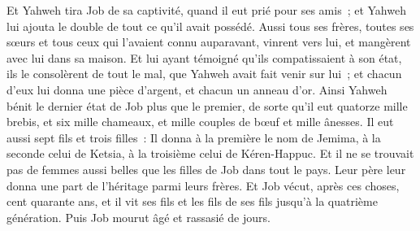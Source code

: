 \begin{multicols}{2}
Et Yahweh tira Job de sa captivité, quand il eut prié pour ses amis~; et Yahweh lui ajouta le double de tout ce qu'il avait possédé.
Aussi tous ses frères, toutes ses sœurs et tous ceux qui l'avaient connu auparavant, vinrent vers lui, et mangèrent avec lui dans sa maison. Et lui ayant témoigné qu'ils compatissaient à son état, ils le consolèrent de tout le mal, que Yahweh avait fait venir sur lui~; et chacun d'eux lui donna une pièce d'argent, et chacun un anneau d'or.
Ainsi Yahweh bénit le dernier état de Job plus que le premier, de sorte qu'il eut quatorze mille brebis, et six mille chameaux, et mille couples de bœuf et mille ânesses.
Il eut aussi sept fils et trois filles~:
Il donna à la première le nom de Jemima, à la seconde celui de Ketsia, à la troisième celui de Kéren-Happuc.
Et il ne se trouvait pas de femmes aussi belles que les filles de Job dans tout le pays. Leur père leur donna une part de l'héritage parmi leurs frères.
Et Job vécut, après ces choses, cent quarante ans, et il vit ses fils et les fils de ses fils jusqu'à la quatrième génération.
Puis Job mourut âgé et rassasié de jours.
\PPE{}
\end{multicols}
